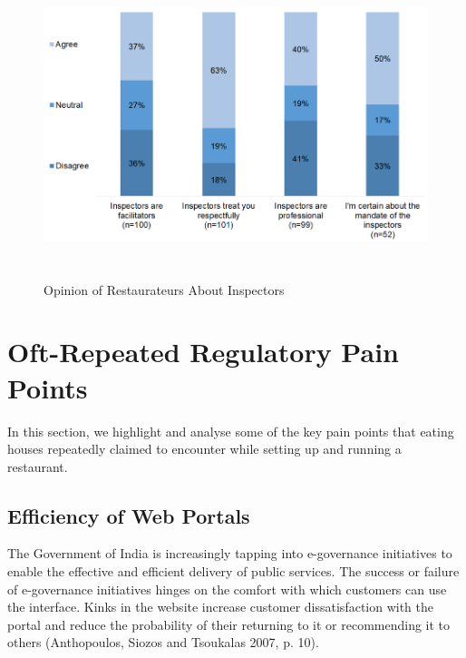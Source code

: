 \documentclass[a4paper, 12pt]{article}
\begin{document}
		\begin{figure}[H]
                    	\centering
                    	\includegraphics[height = 3.5in]{Figure8.png}
                    	\caption[Optional Caption]{Opinion of Restaurateurs About Inspectors} 
		\end{figure}



		\section{Oft-Repeated Regulatory Pain Points}
		\label{sec:3}
		
		In this section, we highlight and analyse some of the key pain points that eating houses repeatedly claimed to encounter while setting up and running a restaurant.
		
		\subsection{Efficiency of Web Portals}
		The Government of India is increasingly tapping into e-governance initiatives to enable the effective and efficient delivery of public services. The success or failure of e-governance initiatives hinges on the comfort with which customers can use the 
interface. Kinks in the website increase customer dissatisfaction with the portal and reduce the probability of their returning to it or recommending it to others (Anthopoulos, Siozos and Tsoukalas 2007, p. 10). 
		
\end{document}
